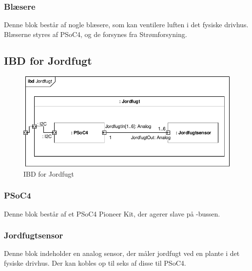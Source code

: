 \subsubsection{Blæsere}
Denne blok består af nogle blæsere, som kan ventilere luften i det fysiske drivhus. Blæserne styres af PSoC4, og de forsynes fra Strømforsyning. 

\subsection{IBD for Jordfugt}

\begin{figure}[h]
\centering 
\includegraphics[width={\textwidth}] {../fig/ibd_jordfugt.pdf}
\caption{IBD for Jordfugt}
\label{fig:ibd_jordfugt}
\end{figure}

\subsubsection{PSoC4}
Denne blok består af et PSoC4 Pioneer Kit, der agerer slave på \IIC-bussen. 
\subsubsection{Jordfugtsensor}
Denne blok indeholder en analog sensor, der måler jordfugt ved en plante i det fysiske drivhus. Der kan kobles op til seks af disse til PSoC4.

\clearpage

